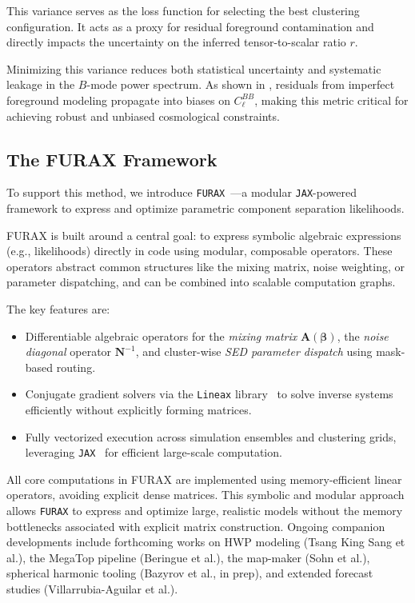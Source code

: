 \documentclass[fleqn,usenatbib]{mnras}
\begin{document}
This variance serves as the loss function for selecting the best clustering configuration. It acts as a proxy for residual foreground contamination and directly impacts the uncertainty on the inferred tensor-to-scalar ratio \( r \).

Minimizing this variance reduces both statistical uncertainty and systematic leakage in the \( B \)-mode power spectrum. As shown in \citep{Errard2015}, residuals from imperfect foreground modeling propagate into biases on \( C_\ell^{BB} \), making this metric critical for achieving robust and unbiased cosmological constraints.

\subsection{The FURAX Framework}

To support this method, we introduce \texttt{FURAX}~\citep{FURAX}---a modular \texttt{JAX}-powered framework to express and optimize parametric component separation likelihoods.

FURAX is built around a central goal: to express symbolic algebraic expressions (e.g., likelihoods) directly in code using modular, composable operators. These operators abstract common structures like the mixing matrix, noise weighting, or parameter dispatching, and can be combined into scalable computation graphs.

The key features are:
\begin{itemize}
    \item Differentiable algebraic operators for the \textit{mixing matrix} \( \mathbf{A}(\boldsymbol{\beta}) \), the \textit{noise diagonal} operator \( \mathbf{N}^{-1} \), and cluster-wise \textit{SED parameter dispatch} using mask-based routing.
    \item Conjugate gradient solvers via the \texttt{Lineax} library~\citep{lineax} to solve inverse systems efficiently without explicitly forming matrices.
    \item Fully vectorized execution across simulation ensembles and clustering grids, leveraging \texttt{JAX}~\citep{JAX} for efficient large-scale computation.
\end{itemize}

All core computations in FURAX are implemented using memory-efficient linear operators, avoiding explicit dense matrices. This symbolic and modular approach allows \texttt{FURAX} to express and optimize large, realistic models without the memory bottlenecks associated with explicit matrix construction. Ongoing companion developments include forthcoming works on HWP modeling (Tsang King Sang et al.), the MegaTop pipeline (Beringue et al.), the map-maker (Sohn et al.), spherical harmonic tooling (Bazyrov et al., in prep), and extended forecast studies (Villarrubia-Aguilar et al.).
\end{document}
